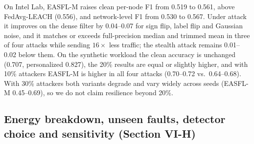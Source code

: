 On Intel Lab, EASFL-M raises clean per-node F1 from 0.519 to 0.561, above FedAvg-LEACH (0.556), and network-level F1 from 0.530 to 0.567. Under attack it improves on the dense filter by 0.04--0.07 for sign flip, label flip and Gaussian noise, and it matches or exceeds full-precision median and trimmed mean in three of four attacks while sending $16\times$ less traffic; the stealth attack remains 0.01--0.02 below them. On the synthetic workload the clean accuracy is unchanged (0.707, personalized 0.827), the 20\% results are equal or slightly higher, and with 10\% attackers EASFL-M is higher in all four attacks (0.70--0.72 vs.\ 0.64--0.68). With 30\% attackers both variants degrade and vary widely across seeds (EASFL-M 0.45--0.69), so we do not claim resilience beyond 20\%.

\subsection*{Energy breakdown, unseen faults, detector choice and sensitivity (Section VI-H)}
